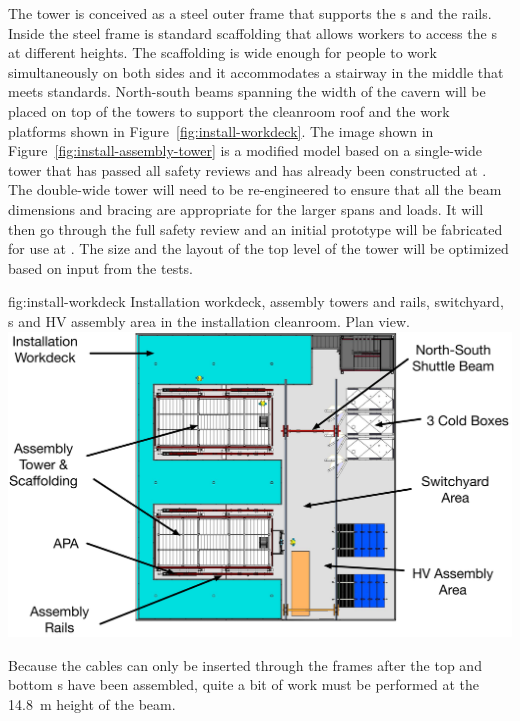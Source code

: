 The  tower is conceived as a steel outer frame that supports the s and the rails. Inside the steel frame is standard scaffolding that allows workers to access the s at different heights. 
The scaffolding is wide enough for people to work simultaneously on both sides and it accommodates a stairway in the middle that meets  standards. 
North-south beams spanning the width of the cavern will be placed on top of the towers to support the cleanroom roof and the work platforms shown in Figure~\ref{fig:install-workdeck}.
The image shown in Figure~\ref{fig:install-assembly-tower} is a modified model based on a single-wide  tower that has passed all safety reviews and has already been constructed at . 
The double-wide tower will need to be re-engineered to ensure that all the beam dimensions and bracing are appropriate for the larger spans and loads. 
It will then go through the full safety review and an initial prototype 
will be fabricated for use at  . 
The size and the layout of the top level of the tower will be optimized based on input from the   tests. 


\begin{dunefigure}{fig:install-workdeck}
  {Installation workdeck, assembly towers and  rails, switchyard, \coldbox{}s and HV assembly area in the installation cleanroom. Plan view. 
  }
\includegraphics[width=.75\textwidth]{graphics/install-workdeck}
\end{dunefigure}

Because the cables can only be inserted through the  frames after the top and bottom s have been assembled, quite a bit 
of work must be performed at the \SI{14.8}{m} height of the  beam. 

